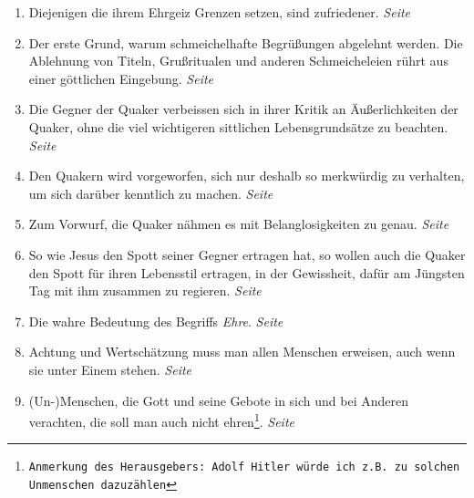 \begin{enumerate}
 \item Diejenigen die ihrem Ehrgeiz Grenzen setzen, sind zufriedener.
 \dotfill \textit{Seite~\pageref{ref:08_09_friedem}}\\

 \item Der erste Grund, warum schmeichelhafte Begrüßungen abgelehnt werden. Die
Ablehnung von Titeln, Grußritualen und anderen Schmeicheleien rührt aus einer
göttlichen Eingebung.
 \dotfill \textit{Seite~\pageref{ref:09_05_offenbarung}}\\

 \item Die Gegner der Quaker verbeissen sich in ihrer Kritik an Äußerlichkeiten
der Quaker, ohne die viel wichtigeren sittlichen Lebensgrundsätze zu beachten.
 \dotfill \textit{Seite~\pageref{ref:09_06_grundsaetze}}\\

 \item Den Quakern wird vorgeworfen, sich nur deshalb so merkwürdig zu
verhalten, um sich darüber kenntlich zu machen.
 \dotfill \textit{Seite~\pageref{ref:09_07_vorwurff}}\\

 \item Zum Vorwurf, die Quaker nähmen es mit Belanglosigkeiten zu genau.
 \dotfill \textit{Seite~\pageref{ref:09_08_vorwurff}}\\

 \item So wie Jesus den Spott seiner Gegner ertragen hat, so wollen auch die
Quaker den Spott für ihren Lebensstil ertragen, in der Gewissheit, dafür am
Jüngsten Tag mit ihm zusammen zu regieren.
 \dotfill \textit{Seite~\pageref{ref:09_10_spott}}\\

 \item Die wahre Bedeutung des Begriffs \textit{Ehre}.
 \dotfill \textit{Seite~\pageref{ref:09_12_ehre}}\\

 \item Achtung und Wertschätzung muss man allen Menschen erweisen, auch wenn sie
unter Einem stehen.
 \dotfill \textit{Seite~\pageref{ref:09_18_ehre}}\\

 \item (Un-)Menschen, die Gott und seine Gebote in sich und bei Anderen
verachten, die soll man auch nicht ehren\footnote{\texttt{Anmerkung des
Herausgebers: Adolf Hitler würde ich z.B. zu solchen Unmenschen dazuzählen}}.
 \dotfill \textit{Seite~\pageref{ref:09_19_ehre}}\\


\end{enumerate}
